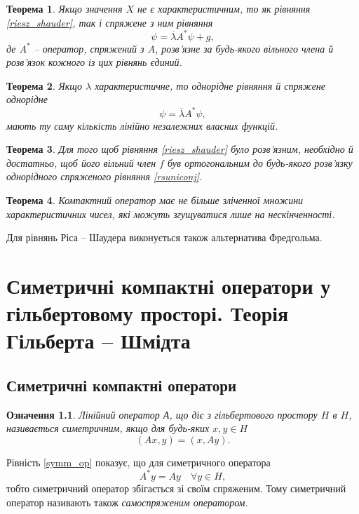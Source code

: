 \documentclass[14pt,twoside]{extreport}
\theoremstyle{mystyle}
\newtheorem{dfn}{Означення}
\newtheorem{thm}{Теорема}
\numberwithin{equation}{chapter}
\begin{document}
\begin{thm}
	Якщо значення $X$ не є характеристичним, то як рівняння \eqref{riesz_shauder}, так і спряжене з ним рівняння
	\begin{equation}
	\psi = \overline{\lambda}A^* \psi + g,
	\end{equation}
	де $A^*$ -- оператор, спряжений з $A$, розв'язне за будь-якого вільного члена й розв'язок кожного із цих рівнянь єдиний.
\end{thm}
\begin{thm}
	Якщо $\lambda$ характеристичне, то однорідне рівняння й спряжене однорідне
	\begin{equation}\label{rsuniconj}
	\psi = \overline{\lambda}A^* \psi,
	\end{equation}
	мають ту саму кількість лінійно незалежних власних функцій.
\end{thm}
\begin{thm}
	Для того щоб рівняння \eqref{riesz_shauder} було розв'язним, необхідно й достатньо, щоб його вільний член $f$ був ортогональним до будь-якого розв'язку однорідного спряженого рівняння \eqref{rsuniconj}.
\end{thm}
\begin{thm}
	Компактний оператор має не більше зліченної множини характеристичних чисел, які можуть згущуватися лише на нескінченності.
\end{thm}

Для рівнянь Ріса -- Шаудера виконується також альтернатива Фредгольма.

\chapter{Симетричні компактні оператори у гільбертовому просторі. Теорія Гільберта -- Шмідта}

\section{Симетричні компактні оператори}

\begin{dfn}
Лінійний оператор А, що діє з гільбертового простору $H$ в $H$, називається симетричним, якщо для будь-яких $x, y \in H$
\begin{equation}\label{symm_op}
 (Ax, y) = (x, Ay).
\end{equation}
\end{dfn}
Рівність \eqref{symm_op} показує, що для симетричного оператора
\[
A^* y =Ay\quad \forall y\in H,
\]
тобто симетричний оператор збігається зі своїм спряженим. Тому симетричний оператор називають також \emph{самоспряженим оператором}.
\end{document}
